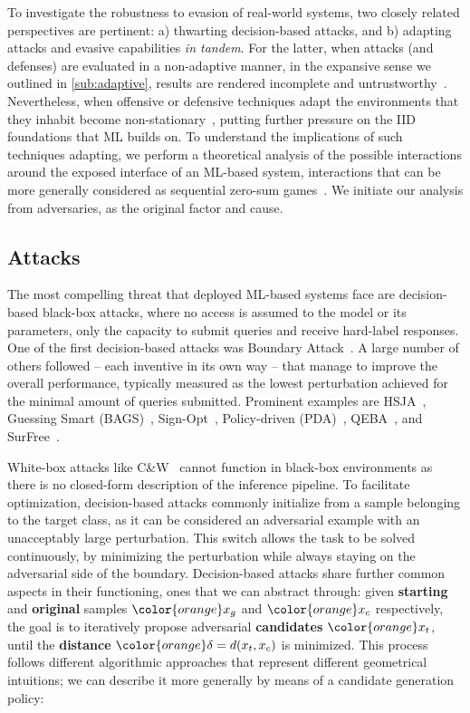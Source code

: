 \label{sec:approach}
To investigate the robustness to evasion of real-world systems, two closely related perspectives are pertinent: a) thwarting decision-based attacks, and b) adapting attacks and evasive capabilities \textit{in tandem}.
For the latter, when attacks (and defenses) are evaluated in a non-adaptive manner, in the expansive sense we outlined in \autoref{sub:adaptive}, results are rendered incomplete and untrustworthy~\cite{tramer2020adaptive, pintor2022indicators}.
Nevertheless, when offensive or defensive techniques adapt the environments that they inhabit become non-stationary~\cite{hernandez2017survey}, putting further pressure on the IID foundations that ML builds on.
To understand the implications of such techniques adapting, we perform a theoretical analysis of the possible interactions around the exposed interface of an ML-based system, interactions that can be more generally considered as sequential zero-sum games~\cite{littman1994markov, hardt2016strategic, bose2020adversarial}.
We initiate our analysis from adversaries, as the original factor and cause.

\subsection{Attacks}
The most compelling threat that deployed ML-based systems face are decision-based black-box attacks, where no access is assumed to the model or its parameters, only the capacity to submit queries and receive hard-label responses.
One of the first decision-based attacks was Boundary Attack~\cite{brendel2018decision}.
A large number of others followed -- each inventive in its own way -- that manage to improve the overall performance, typically measured as the lowest perturbation achieved for the minimal amount of queries submitted.
Prominent examples are HSJA~\cite{chen2020hopskipjumpattack}, Guessing Smart (BAGS)~\cite{brunner2019guessing}, Sign-Opt~\cite{cheng2019sign}, Policy-driven (PDA)~\cite{yan2020policy}, QEBA~\cite{li2020qeba}, and SurFree~\cite{maho2021surfree}.

White-box attacks like C\&W~\cite{carlini2017towards} cannot function in black-box environments as there is no closed-form description of the inference pipeline.
To facilitate optimization, decision-based attacks commonly initialize from a sample belonging to the target class, as it can be considered an adversarial example with an unacceptably large perturbation.
This switch allows the task to be solved continuously, by minimizing the perturbation while always staying on the adversarial side of the boundary.
Decision-based attacks share further common aspects in their functioning, ones that we can abstract through: given \textbf{starting} and \textbf{original} samples $\color{orange}x_g$ and $\color{orange}x_{c}$ respectively, the goal is to iteratively propose adversarial \textbf{candidates} $\color{orange}x_t$, until the \textbf{distance} $\color{orange}\delta = d(x_t, x_c)$ is minimized.
This process follows different algorithmic approaches that represent different geometrical intuitions; we can describe it more generally by means of a candidate generation policy:

